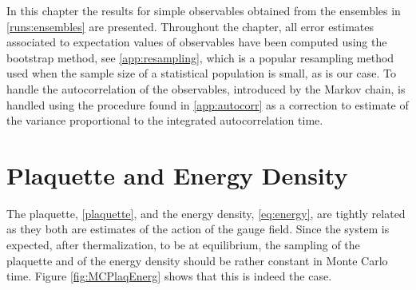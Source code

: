 In this chapter the results for simple observables obtained from the ensembles in \cref{runs:ensembles} are presented. Throughout the chapter, all error estimates associated to expectation values of observables have been computed using the bootstrap method, see \cref{app:resampling}, which is a popular resampling method used when the sample size of a statistical population is small, as is our case. To handle the autocorrelation of the observables, introduced by the Markov chain, is handled using the procedure found in \cref{app:autocorr} as a correction to estimate of the variance proportional to the integrated autocorrelation time.

\section{Plaquette and Energy Density} 
The plaquette, \cref{plaquette}, and the energy density, \cref{eq:energy}, are tightly related as they both are estimates of the action of the gauge field.
Since the system is expected, after thermalization, to be at equilibrium, the sampling of the plaquette and of the energy density should be rather constant in Monte Carlo time. Figure \ref{fig:MCPlaqEnerg} shows that this is indeed the case.
